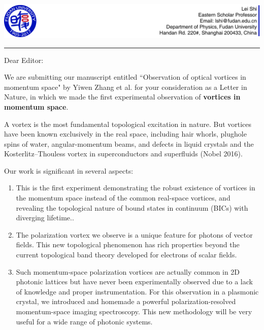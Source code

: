 \documentclass[a4paper,12pt]{article}
\begin{document}




\begin{spacing}{1.0}

\begin{flushleft}
\includegraphics[scale=1.0]{fudan-logo}
\rule{\textwidth}{0.4pt}
\end{flushleft}


\noindent Dear Editor:

\bigskip

\noindent We are submitting our manuscript entitled ``Observation of optical vortices in momentum space" by Yiwen Zhang et al. for your consideration as a Letter in Nature, in which we made the first experimental observation of \textbf{vortices in momentum space}.

\bigskip

\noindent A vortex is the most fundamental topological excitation in nature. But vortices have been known exclusively in the real space, including hair whorls, plughole spins of water, angular-momentum beams, and defects in liquid crystals and the Kosterlitz--Thouless vortex in superconductors and superfluids (Nobel 2016).

\noindent Our work is significant in several aspects:
\begin{enumerate}
  \item This is the first experiment demonstrating the robust existence of vortices in the momentum space instead of the common real-space vortices, and revealing the topological nature of bound states in continuum (BICs) with diverging lifetime..
  \item The polarization vortex we observe is a unique feature for photons of vector fields. This new topological phenomenon has rich properties beyond the current topological band theory developed for electrons of scalar fields.
  \item Such momentum-space polarization vortices are actually common in 2D photonic lattices but have never been experimentally observed due to a lack of knowledge and proper instrumentation. For this observation in a plasmonic crystal, we introduced and homemade a powerful polarization-resolved momentum-space imaging spectroscopy. This new methodology will be very useful for a wide range of photonic systems.
\end{enumerate}


\end{spacing}
\end{document}
